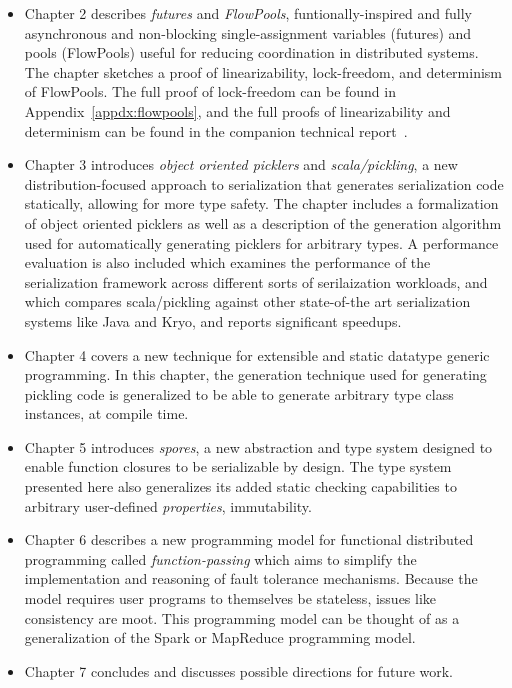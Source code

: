 \begin{itemize}

	\item Chapter 2 describes {\em futures} and {\em FlowPools}, funtionally-inspired
	and fully asynchronous and non-blocking single-assignment variables (futures)
	and pools (FlowPools) useful for reducing coordination in distributed systems.
	The chapter sketches a proof of linearizability, lock-freedom, and determinism
	of FlowPools. The full proof of lock-freedom can be found in
	Appendix~\ref{appdx:flowpools}, and the full proofs of linearizability and
	determinism can be found in the companion technical report~\cite{Prokopec12}.

	\item Chapter 3 introduces {\em object oriented picklers} and {\em
	scala/pickling}, a new distribution-focused approach to serialization that
	generates serialization code statically, allowing for more type safety. The
	chapter includes a formalization of object oriented picklers as well as a
	description of the generation algorithm used for automatically generating
	picklers for arbitrary types. A performance evaluation is also included which
	examines the performance of the serialization framework across different sorts
	of serilaization workloads, and which compares scala/pickling against other
	state-of-the art serialization systems like Java and Kryo, and reports
	significant speedups.

	\item Chapter 4 covers a new technique for extensible and static datatype
	generic programming. In this chapter, the generation technique used for
	generating pickling code is generalized to be able to generate arbitrary type
	class instances, at compile time.

	\item Chapter 5 introduces {\em spores}, a new abstraction and type system
	designed to enable function closures to be serializable by design. The type
	system presented here also generalizes its added static checking capabilities
	to arbitrary user-defined {\em properties}, \eg immutability.

	\item Chapter 6 describes a new programming model for functional distributed
	programming called {\em function-passing} which aims to simplify the
	implementation and reasoning of fault tolerance mechanisms. Because the model
	requires user programs to themselves be stateless, issues like consistency are
	moot. This programming model can be thought of as a generalization of the Spark
	or MapReduce programming model.

	\item Chapter 7 concludes and discusses possible directions for future work.

\end{itemize}

